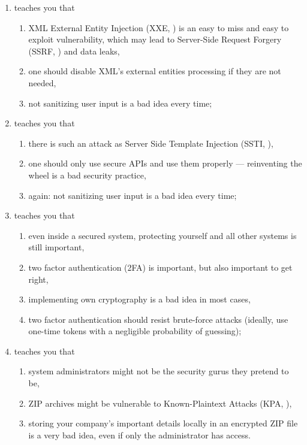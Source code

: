 \documentclass[11pt, a4paper]{article}
\begin{document}
\begin{enumerate}
  \item teaches you that
        \begin{enumerate}
          \item XML External Entity Injection (XXE, \citep{xxe}) is an easy to miss and easy to exploit vulnerability, which may lead to Server-Side Request Forgery (SSRF, \citep{ssrf}) and data leaks,
          \item one should disable XML's external entities processing if they are not needed,
          \item not sanitizing user input is a bad idea every time;
        \end{enumerate}

  \item teaches you that
        \begin{enumerate}
          \item there is such an attack as Server Side Template Injection (SSTI, \citep{ssti}),
          \item one should only use secure APIs and use them properly --- reinventing the wheel is a bad security practice,
          \item again: not sanitizing user input is a bad idea every time;
        \end{enumerate}

  \item teaches you that
        \begin{enumerate}
          \item even inside a secured system, protecting yourself and all other systems
                is still important,
          \item two factor authentication (2FA) is important, but also important to get right,
          \item implementing own cryptography is a bad idea in most cases,
          \item two factor authentication should resist brute-force attacks (ideally, use one-time tokens with a negligible probability of guessing);
        \end{enumerate}

  \item teaches you that
        \begin{enumerate}
          \item system administrators might not be the security gurus they pretend to be,
          \item ZIP archives might be vulnerable to Known-Plaintext Attacks (KPA, \citep{kpa}),
          \item storing your company's important details locally in an encrypted ZIP
                file is a very bad idea, even if only the administrator has access.
        \end{enumerate}

\end{enumerate}
\end{document}
